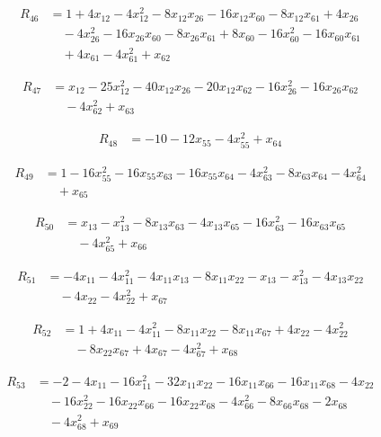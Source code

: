 \begin{align*}
R_{46} &= 1 +4 x_{12} -4 x_{12}^{2} -8 x_{12} x_{26} -16 x_{12} x_{60} -8 x_{12} x_{61} +4 x_{26} \\
&\quad -4 x_{26}^{2} -16 x_{26} x_{60} -8 x_{26} x_{61} +8 x_{60} -16 x_{60}^{2} -16 x_{60} x_{61} \\
&\quad +4 x_{61} -4 x_{61}^{2} +x_{62}
\end{align*}

\begin{align*}
R_{47} &= x_{12} -25 x_{12}^{2} -40 x_{12} x_{26} -20 x_{12} x_{62} -16 x_{26}^{2} -16 x_{26} x_{62} \\
&\quad -4 x_{62}^{2} +x_{63}
\end{align*}

\begin{align*}
R_{48} &= -10 -12 x_{55} -4 x_{55}^{2} +x_{64}
\end{align*}

\begin{align*}
R_{49} &= 1 -16 x_{55}^{2} -16 x_{55} x_{63} -16 x_{55} x_{64} -4 x_{63}^{2} -8 x_{63} x_{64} -4 x_{64}^{2} \\
&\quad +x_{65}
\end{align*}

\begin{align*}
R_{50} &= x_{13} -x_{13}^{2} -8 x_{13} x_{63} -4 x_{13} x_{65} -16 x_{63}^{2} -16 x_{63} x_{65} \\
&\quad -4 x_{65}^{2} +x_{66}
\end{align*}

\begin{align*}
R_{51} &= -4 x_{11} -4 x_{11}^{2} -4 x_{11} x_{13} -8 x_{11} x_{22} -x_{13} -x_{13}^{2} -4 x_{13} x_{22} \\
&\quad -4 x_{22} -4 x_{22}^{2} +x_{67}
\end{align*}

\begin{align*}
R_{52} &= 1 +4 x_{11} -4 x_{11}^{2} -8 x_{11} x_{22} -8 x_{11} x_{67} +4 x_{22} -4 x_{22}^{2} \\
&\quad -8 x_{22} x_{67} +4 x_{67} -4 x_{67}^{2} +x_{68}
\end{align*}

\begin{align*}
R_{53} &= -2 -4 x_{11} -16 x_{11}^{2} -32 x_{11} x_{22} -16 x_{11} x_{66} -16 x_{11} x_{68} -4 x_{22} \\
&\quad -16 x_{22}^{2} -16 x_{22} x_{66} -16 x_{22} x_{68} -4 x_{66}^{2} -8 x_{66} x_{68} -2 x_{68} \\
&\quad -4 x_{68}^{2} +x_{69}
\end{align*}

